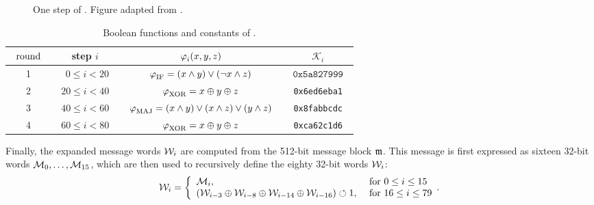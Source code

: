 \begin{figure}[ht]
\begin{center}

\caption[One step of \shaone.]{One step of \shaone. Figure adapted from \cite{TiKZ:Cryptographers}.\label{fig:sha1_step}}
\end{center}
\end{figure}


\renewcommand{\arraystretch}{1.2}
\begin{table}[ht]
\caption{\label{tab:sha_spec}Boolean functions and constants of \shaone.}
\begin{center}
\begin{tabular}{c c c c} \toprule
$\;\; \textnormal{round} \;\;$ & step $i$ & $\operatorname{\varphi}_i(x,y,z)$ &  $\mathcal{K}_i$ \\ \midrule
1 & $\;\;  \:\:0 \leq i <  20 \;\;$  & $\operatorname{\varphi}_{\text{IF}} = (x \wedge y) \vee (\neg x \wedge z)$ & $\;\; \texttt{0x5a827999} \;\;$ \\
2 & $20 \leq i <  40$ & $\operatorname{\varphi}_{\text{XOR}} = x \oplus y \oplus z$ & \texttt{0x6ed6eba1} \\
3 & $40 \leq i <  60$ & $\;\;  \operatorname{\varphi}_{\text{MAJ}} = (x \wedge y) \vee (x \wedge z) \vee (y \wedge z) \;\;$  & \texttt{0x8fabbcdc} \\
4 & $60 \leq i <  80$ & $\operatorname{\varphi}_{\text{XOR}} = x \oplus y \oplus z $ & \texttt{0xca62c1d6} \\
\bottomrule
\end{tabular}
\end{center}
\end{table}

\noindent
Finally, the expanded message words $\mathcal{W}_i$ are computed from the 512-bit message block $\mathfrak{m}$. This message is first expressed as
sixteen 32-bit words $\mathcal{M}_0,\ldots, \mathcal{M}_{15}$, which are then used to recursively define the eighty 32-bit words $\mathcal{W}_i$:
\begin{equation}
\label{eq:exp_mess}
\mathcal{W}_i=
\left\{
\begin{array}{ll}
\mathcal{M}_i, & \textnormal{ for } 0\leq i\leq 15 \\
(\mathcal{W}_{i-3} \oplus \mathcal{W}_{i-8} \oplus \mathcal{W}_{i-14} \oplus \mathcal{W}_{i-16}) \circlearrowleft 1, & \textnormal{ for } 16\leq i\leq 79
\end{array}.
\right.
\end{equation}


